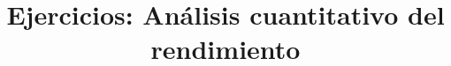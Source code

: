 

\title{Ejercicios: Análisis cuantitativo del rendimiento}



\maketitle

\pagestyle{fancyplain}





